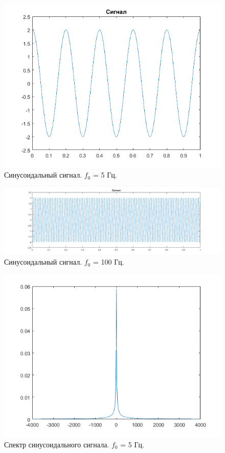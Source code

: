 \documentclass[a4paper,14pt]{extarticle}
\begin{document}
\begin{figure}[H]
\centering
\includegraphics[scale=0.75]{pics/sin5Hz.png}
\caption{Синусоидальный сигнал. $f_0$ = 5 Гц.}
\label{sin5}
\end{figure}
\begin{figure}[H]
\centering
\includegraphics[scale=0.5]{pics/sin100Hz.png}
\caption{Синусоидальный сигнал. $f_0$ = 100 Гц.}
\label{sin100}
\end{figure}
\begin{figure}[H]
\centering
\includegraphics[scale=0.75]{pics/sin5Hz_spec.png}
\caption{Спектр синусоидального сигнала. $f_0$ = 5 Гц.}
\label{sin5_}
\end{figure}
\end{document}

